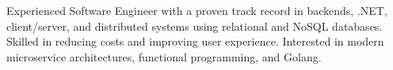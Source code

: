 

\begin{cvparagraph}

Experienced Software Engineer with a proven track record in backends, .NET, client/server, and distributed systems using relational and NoSQL databases. Skilled in reducing costs and improving user experience. Interested in modern microservice architectures, functional programming, and Golang.
\end{cvparagraph}
